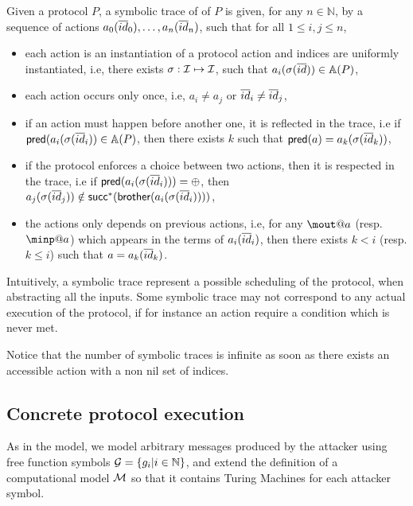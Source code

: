 \begin{definition}
  Given a protocol $P$, a symbolic trace of of $P$ is given, for any 
  $n\in\mathbb{N}$, by a sequence of actions $a_0 (\overline{id}_0),\dots,a_n 
  (\overline{id}_n)$, such that for all $1 \leq i,j \leq n$,
  \begin{itemize}
    \item each action is an instantiation of a protocol action and indices are 
      uniformly instantiated, i.e, there exists $\sigma : \mathcal{I} \mapsto \mathcal{I}$, such 
      that $a_i (\sigma (\overline{id})) \in\mathbb{A}(P)$,
    \item each action occurs only once, i.e, $a_i \neq{} a_j$ or $\overline{id}_i 
      \neq\overline{id}_j$,
    \item if an action must happen before another one, it is reflected in the 
      trace, i.e
      if $\textsf{pred} (a_i(\sigma(\overline{id}_i)) \in \mathbb{A}(P)$, then there exists $k$ 
      such that $\textsf{pred}(a) = a_k(\sigma(\overline{id}_k))$,
    \item if the protocol enforces a choice between two actions, then it is 
      respected in the trace, i.e if $\textsf{pred}(a_i(\sigma(\overline{id}_i))) = \oplus$, 
      then $a_j(\sigma(\overline{id}_j)) \notin \textsf{succ}^*(\textsf{brother} 
      (a_i(\sigma(\overline{id}_i))))$,
      \item the actions only depends on previous actions, i.e, for any 
        $\mout@a$ (resp. $\minp@a$) which appears in the terms of 
        $a_i(\overline{id}_i)$, then there exists $k < i$ (resp. $k \leq i$) such 
        that $a = a_k(\overline{id}_k)$.
      \end{itemize}
\end{definition}
Intuitively, a symbolic trace represent a possible scheduling of the protocol, 
when abstracting all the inputs. Some symbolic trace may not correspond to any 
actual execution of the protocol, if for instance an action require a 
condition which is never met.

Notice that the number of symbolic traces is infinite as soon as there exists 
an accessible action with a non nil set of indices.


\subsection{Concrete protocol execution}
As in the \BC model, we model arbitrary messages produced by the attacker 
using free function symbols $\mathcal{G} = \{g_i | i \in \mathbb{N}\} $, and extend the 
definition of a computational model $\mathcal{M}$ so that it contains Turing Machines 
for each attacker symbol.

